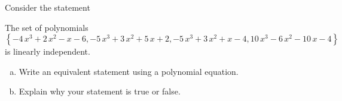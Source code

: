 
\begin{exerciseStatement}


Consider the statement 
\begin{center}\begin{minipage}{0.8\textwidth}
 The set of polynomials \( \left\{ -4 \, x^{3} + 2 \, x^{2} - x - 6 , -5 \, x^{3} + 3 \, x^{2} + 5 \, x + 2 , -5 \, x^{3} + 3 \, x^{2} + x - 4 , 10 \, x^{3} - 6 \, x^{2} - 10 \, x - 4 \right\} \) is linearly independent.
\end{minipage}\end{center}
    


\begin{enumerate}[(a)]
\item  Write an equivalent statement using a polynomial equation.
\item  Explain why your statement is true or false.
\end{enumerate}
    
\end{exerciseStatement}
    
